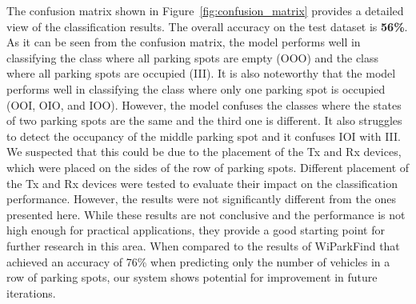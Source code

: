 The confusion matrix shown in Figure~\ref{fig:confusion_matrix} provides a detailed view of the classification results. The overall accuracy on the test dataset is \textbf{56\%}. As it can be seen from the confusion matrix, the model performs well in classifying the class where all parking spots are empty (OOO) and the class where all parking spots are occupied (III). It is also noteworthy that the model performs well in classifying the class where only one parking spot is occupied (OOI, OIO, and IOO). However, the model confuses the classes where the states of two parking spots are the same and the third one is different. It also struggles to detect the occupancy of the middle parking spot and it confuses IOI with III. We suspected that this could be due to the placement of the Tx and Rx devices, which were placed on the sides of the row of parking spots. Different placement of the Tx and Rx devices were tested to evaluate their impact on the classification performance. However, the results were not significantly different from the ones presented here. While these results are not conclusive and the performance is not high enough for practical applications, they provide a good starting point for further research in this area. When compared to the results of WiParkFind that achieved an accuracy of 76\% when predicting only the number of vehicles in a row of parking spots, our system shows potential for improvement in future iterations.